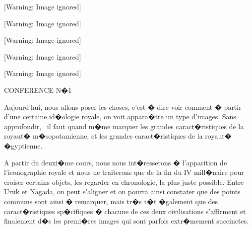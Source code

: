 \documentclass{article}
\begin{document}
\begin{center}
 [Warning: Image ignored] %

\end{center}
\begin{center}
 [Warning: Image ignored] %

\end{center}
\begin{center}
 [Warning: Image ignored] %

\end{center}
\begin{center}
 [Warning: Image ignored] %

\end{center}
\begin{center}
 [Warning: Image ignored] %

\end{center}

\bigskip


\bigskip


\bigskip

CONFERENCE N�1 \ 


\bigskip


\bigskip

Aujourd'hui, nous allons poser les choses, c'est � dire voir comment � partir d'une certaine id�ologie royale, on voit appara�tre un type d'images. Sans approfondir, \ il faut quand m�me marquer les grandes caract�ristiques de la royaut� m�sopotamienne, et les grandes caract�ristiques de la royaut� �gyptienne.


\bigskip

A partir du deuxi�me cours, nous nous int�resserons � l'apparition de l'iconographie royale et nous ne traiterons que de la fin du IV mill�naire pour croiser certains objets, les regarder en chronologie, la plus juste possible. Entre Uruk et Nagada, on peut s'aligner et on pourra ainsi constater que des points communs sont ainsi � remarquer, mais tr�s t�t �galement que des caract�ristiques sp�cifiques � chacune de ces deux civilisations s'affirment et finalement d�s les premi�res images qui sont parfois extr�mement succinctes.
\end{document}

